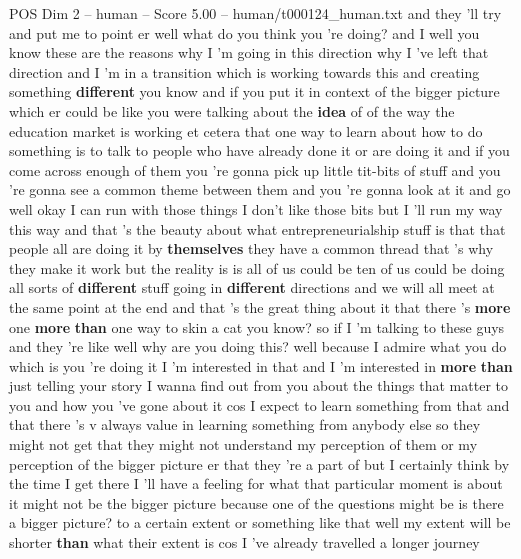\begin{textsample}{POS Dim 2 – human – Score 5.00 – human/t000124\_human.txt}  \label{ex:f2_pos_034}
and they 'll try and put me to point er well what do you think you 're doing? and I well you know these are the reasons why I 'm going in this direction why I 've left that direction and I 'm in a transition which is working towards this and creating something \textbf{different} you know and if you put it in context of the bigger picture which er could be like you were talking about the \textbf{idea} of of the way the education market is working et cetera that one way to learn about how to do something is to talk to people who have already done it or are doing it and if you come across enough of them you 're gonna pick up little tit-bits of stuff and you 're gonna see a common theme between them and you 're gonna look at it and go well okay I can run with those things I don't like those bits but I 'll run my way this way and that 's the beauty about what entrepreneurialship stuff is that that people all are doing it by \textbf{themselves} they have a common thread that 's why they make it work but the reality is is all of us could be ten of us could be doing all sorts of \textbf{different} stuff going in \textbf{different} directions and we will all meet at the same point at the end and that 's the great thing about it that there 's \textbf{more} one \textbf{more} \textbf{than} one way to skin a cat you know? so if I 'm talking to these guys and they 're like well why are you doing this? well because I admire what you do which is you 're doing it I 'm interested in that and I 'm interested in \textbf{more} \textbf{than} just telling your story I wanna find out from you about the things that matter to you and how you 've gone about it cos I expect to learn something from that and that there 's v always value in learning something from anybody else so they might not get that they might not understand my perception of them or my perception of the bigger picture er that they 're a part of but I certainly think by the time I get there I 'll have a feeling for what that particular moment is about it might not be the bigger picture because one of the questions might be is there a bigger picture? to a certain extent or something like that well my extent will be shorter \textbf{than} what their extent is cos I 've already travelled a longer journey

\end{textsample}
